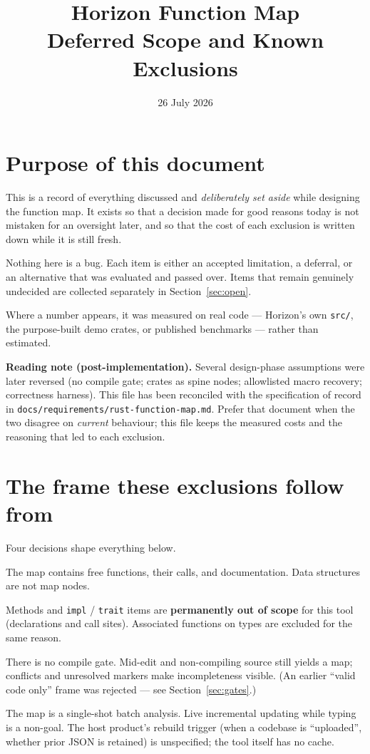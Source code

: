 \documentclass[11pt,a4paper]{article}
\title{Horizon Function Map\\[0.3em]\large Deferred Scope and Known Exclusions}
\author{}
\date{26 July 2026}
\begin{document}
\maketitle

\section{Purpose of this document}

This is a record of everything discussed and \emph{deliberately set aside} while
designing the function map. It exists so that a decision made for good reasons
today is not mistaken for an oversight later, and so that the cost of each
exclusion is written down while it is still fresh.

Nothing here is a bug. Each item is either an accepted limitation, a deferral, or
an alternative that was evaluated and passed over. Items that remain genuinely
undecided are collected separately in Section~\ref{sec:open}.

Where a number appears, it was measured on real code --- Horizon's own
\verb|src/|, the purpose-built demo crates, or published benchmarks --- rather
than estimated.

\textbf{Reading note (post-implementation).} Several design-phase assumptions
were later reversed (no compile gate; crates as spine nodes; allowlisted macro
recovery; correctness harness). This file has been reconciled with the
specification of record in
\texttt{docs/requirements/rust-function-map.md}. Prefer that document when the
two disagree on \emph{current} behaviour; this file keeps the measured costs and
the reasoning that led to each exclusion.

\section{The frame these exclusions follow from}

Four decisions shape everything below.

\begin{description}[style=nextline,leftmargin=1em]
  \item[Functions only.] The map contains free functions, their calls, and
    documentation. Data structures are not map nodes.
  \item[Free functions only.] Methods and \verb|impl| / \verb|trait| items are
    \textbf{permanently out of scope} for this tool (declarations and call
    sites). Associated functions on types are excluded for the same reason.
  \item[Build the tree always.] There is no compile gate. Mid-edit and
    non-compiling source still yields a map; conflicts and unresolved markers
    make incompleteness visible. (An earlier ``valid code only'' frame was
    rejected --- see Section~\ref{sec:gates}.)
  \item[Batch updates.] The map is a single-shot batch analysis. Live
    incremental updating while typing is a non-goal. The host product's
    rebuild trigger (when a codebase is ``uploaded'', whether prior JSON is
    retained) is unspecified; the tool itself has no cache.
\end{description}
\end{document}
